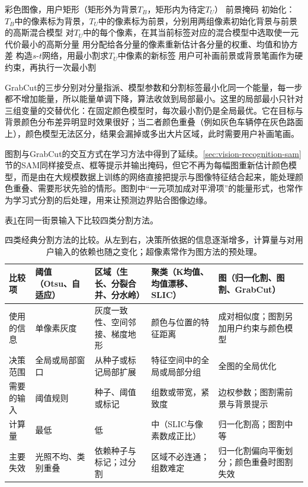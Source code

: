\begin{algorithm}[GrabCut]
  \label{alg:vision-features-grabcut}
  \begin{algorithmic}[1]
    \Require 彩色图像，用户矩形（矩形外为背景$T_B$，矩形内为待定$T_U$）
    \Ensure 前景掩码
    \State 初始化：$T_B$中的像素标为背景，$T_U$中的像素标为前景，分别用两组像素初始化背景与前景的高斯混合模型
    \Repeat
      \State 对$T_U$中的每个像素，在其当前标签对应的混合模型中选取使一元代价最小的高斯分量
      \State 用分配给各分量的像素重新估计各分量的权重、均值和协方差
      \State 构造$s$-$t$网络，用最小割求$T_U$中像素的新标签
    \State 用户可补画前景或背景笔画作为硬约束，再执行一次最小割
  \end{algorithmic}
\end{algorithm}

GrabCut的三步分别对分量指派、模型参数和分割标签最小化同一个能量，每一步都不增加能量，所以能量单调下降，算法收敛到局部最小。这里的局部最小只针对三组变量的交替优化：在固定颜色模型时，每次最小割仍是全局最优。它在目标与背景颜色分布差异明显时效果很好；当二者颜色重叠（例如灰色车辆停在灰色路面上），颜色模型无法区分，结果会漏掉或多出大片区域，此时需要用户补画笔画。

图割与GrabCut的交互方式在学习方法中得到了延续。\ref{sec:vision-recognition-sam}节的SAM同样接受点、框等提示并输出掩码，但它不再为每幅图重新估计颜色模型，而是由在大规模数据上训练的网络直接把提示与图像特征结合起来，能处理颜色重叠、需要形状先验的情形。图割中“一元项加成对平滑项”的能量形式，也常作为学习式分割的后处理，用来让预测边界贴合图像边缘。

表\ref{tab:vision-features-segmentation-compare}在同一街景输入下比较四类分割方法。

\begin{table}[tbp]
  \centering
  \small
  \begin{tabularx}{\linewidth}{@{}lXXXX@{}}
    \toprule
    比较项 & 阈值（Otsu、自适应） & 区域（生长、分裂合并、分水岭） & 聚类（K均值、均值漂移、SLIC） & 图（归一化割、图割、GrabCut） \\
    \midrule
    使用的信息 & 单像素灰度 & 灰度一致性、空间邻接、梯度地形 & 颜色与位置的特征距离 & 成对相似度；图割另加用户约束与颜色模型 \\
    决策范围 & 全局或局部窗口 & 从种子或标记局部扩展 & 特征空间中的全局或局部分组 & 全图的全局优化 \\
    需要的输入 & 阈值规则 & 种子、阈值或标记 & 组数或带宽，紧致度 & 边权参数；图割需前景与背景提示 \\
    计算量 & 最低 & 低 & 中（SLIC与像素数成正比） & 归一化割高；图割中等 \\
    主要失效 & 光照不均、类别重叠 & 依赖种子与标记；过分割 & 区域不必连通；组数难定 & 归一化割偏向平衡划分；颜色重叠时图割失效 \\
    \bottomrule
  \end{tabularx}
  \caption{四类经典分割方法的比较。从左到右，决策所依据的信息逐渐增多，计算量与对用户输入的依赖也随之变化；超像素常作为图方法的预处理。}
  \label{tab:vision-features-segmentation-compare}
\end{table}

